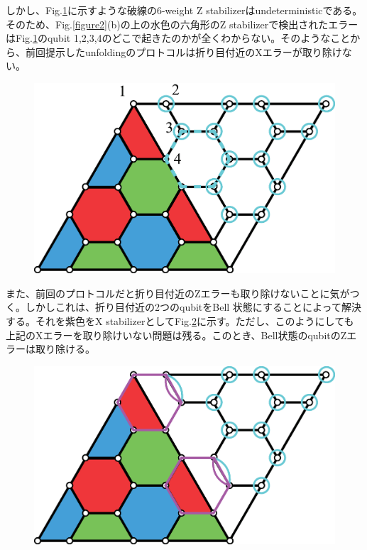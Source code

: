 \documentclass[a4paper,10pt]{ltjsarticle}
\begin{document}
{    しかし、Fig.\ref{figure3}に示すような破線の6-weight Z stabilizerはundeterministicである。そのため、Fig.\ref{figure2}(b)の上の水色の六角形のZ stabilizerで検出されたエラーはFig.\ref{figure3}のqubit 1,2,3,4のどこで起きたのかが全くわからない。そのようなことから、前回提示したunfoldingのプロトコルは折り目付近のXエラーが取り除けない。

    \begin{figure}[h]
        \centering
        \includegraphics[scale=0.3]{figure/figure3.eps}
        \caption{ }
        \label{figure3}
    \end{figure}

    また、前回のプロトコルだと折り目付近のZエラーも取り除けないことに気がつく。しかしこれは、折り目付近の2つのqubitをBell 状態にすることによって解決する。それを紫色をX stabilizerとしてFig.\ref{figure4}に示す。ただし、このようにしても上記のXエラーを取り除けいない問題は残る。このとき、Bell状態のqubitのZエラーは取り除ける。
    
    \begin{figure}[h]
        \centering
        \includegraphics[scale=0.3]{figure/figure4.eps}
        \caption{ }
        \label{figure4}
    \end{figure}

}
\end{document}
